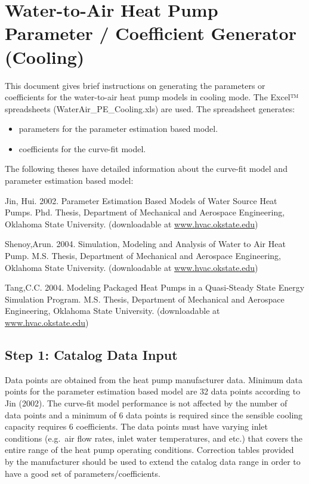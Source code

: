 \section{Water-to-Air Heat Pump Parameter / Coefficient Generator (Cooling)}\label{water-to-air-heat-pump-parameter-coefficient-generator-cooling}

This document gives brief instructions on generating the parameters or coefficients for the water-to-air heat pump models in cooling mode. The Excel™ spreadsheets (WaterAir\_PE\_Cooling.xls) are used. The spreadsheet generates:

\begin{itemize}
\item
  parameters for the parameter estimation based model.
\item
  coefficients for the curve-fit model.
\end{itemize}

The following theses have detailed information about the curve-fit model and parameter estimation based model:

Jin, Hui. 2002. Parameter Estimation Based Models of Water Source Heat Pumps. Phd. Thesis, Department of Mechanical and Aerospace Engineering, Oklahoma State University. (downloadable at \href{http://www.hvac.okstate.edu}{www.hvac.okstate.edu})

Shenoy,Arun. 2004. Simulation, Modeling and Analysis of Water to Air Heat Pump. M.S. Thesis, Department of Mechanical and Aerospace Engineering, Oklahoma State University. (downloadable at \href{http://www.hvac.okstate.edu}{www.hvac.okstate.edu})

Tang,C.C. 2004. Modeling Packaged Heat Pumps in a Quasi-Steady State Energy Simulation Program. M.S. Thesis, Department of Mechanical and Aerospace Engineering, Oklahoma State University. (downloadable at \href{http://www.hvac.okstate.edu}{www.hvac.okstate.edu})

\subsection{Step 1: Catalog Data Input}\label{step-1-catalog-data-input-000}

Data points are obtained from the heat pump manufacturer data. Minimum data points for the parameter estimation based model are 32 data points according to Jin (2002). The curve-fit model performance is not affected by the number of data points and a minimum of 6 data points is required since the sensible cooling capacity requires 6 coefficients. The data points must have varying inlet conditions (e.g.~air flow rates, inlet water temperatures, and etc.) that covers the entire range of the heat pump operating conditions. Correction tables provided by the manufacturer should be used to extend the catalog data range in order to have a good set of parameters/coefficients.

